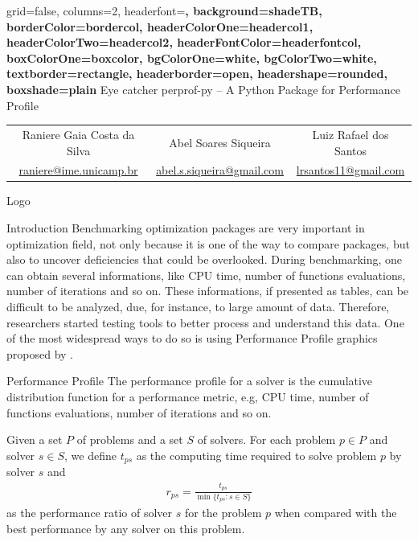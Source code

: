 \documentclass[a0paper,portrait]{baposter}
\begin{document}
\begin{poster}
  {
    grid=false,
    columns=2,
    headerfont=\Large\sf\bf,
    background=shadeTB,
    borderColor=bordercol,
    headerColorOne=headercol1,
    headerColorTwo=headercol2,
    headerFontColor=headerfontcol,
    boxColorOne=boxcolor,
    bgColorOne=white,
    bgColorTwo=white,
    textborder=rectangle,
    headerborder=open,
    headershape=rounded,
    boxshade=plain
  }
  {
    Eye catcher
  }
  {
    perprof-py -- A Python Package for Performance Profile
  }
  {
    \begin{tabular}{ccc}
      Raniere Gaia Costa da Silva &
      Abel Soares Siqueira &
      Luiz Rafael dos Santos \\
      \url{raniere@ime.unicamp.br} &
      \url{abel.s.siqueira@gmail.com} &
      \url{lrsantos11@gmail.com}
    \end{tabular}
  }
  {
    Logo
  }

  \begin{posterbox}[column=0]{Introduction}
    Benchmarking optimization packages are very important in optimization
    field, not only because it is one of the way to compare packages, but also
    to uncover deficiencies that could be overlooked. During benchmarking, one
    can obtain several informations, like CPU time, number of functions
    evaluations, number of iterations and so on. These informations, if
    presented as tables, can be difficult to be analyzed, due, for instance,
    to large amount of data. Therefore, researchers started testing tools to
    better process and understand this data.  One of the most widespread ways
    to do so is using Performance Profile graphics proposed by
    \cite{Dolan2001}.
  \end{posterbox}

  \begin{posterbox}[column=0,below=auto]{Performance Profile}
    The performance profile for a solver is the cumulative distribution
    function for a performance metric, e.g, CPU time, number of functions
    evaluations, number of iterations and so on.

    Given a set $P$ of problems and a set $S$ of solvers. For each problem $p
    \in P$ and solver $s \in S$, we define $t_{ps}$ as the computing time
    required to solve problem $p$ by solver $s$ and
    \begin{align*}
      r_{ps} = \frac{t_{ps}}{\min\{t_{ps}: s \in S\}}
    \end{align*}
    as the performance ratio of solver $s$ for the problem $p$ when compared
    with the best performance by any solver on this problem.


\end{posterbox}
\end{poster}
\end{document}
